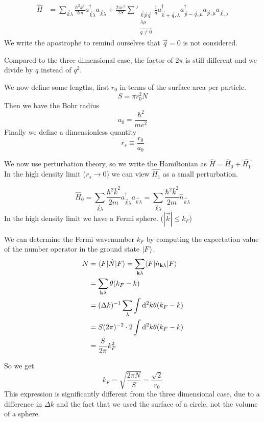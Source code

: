 \begin{align*}
\hat{H} &= \sum_{\vec{k}\lambda}\frac{\hbar^2 k^2}{2m}a^\dagger_{\vec{k}\lambda}a_{\vec{k}\lambda}+ \frac{2\pi e^2}{2 S}\sum'_{\substack{\vec{k} \vec{p} \vec{q} \\ \lambda \mu \\ \vec{q \neq 0}}} \frac{1}{q}a^\dagger_{\vec{k}+ \vec{q}, \lambda}a^\dagger_{\vec{p}- \vec{q}, \mu}a_{\vec{p},\mu}a_{\vec{k}, \lambda}
\end{align*}
We write the apostrophe to remind ourselves that $\vec{q} = 0$ is not considered.

Compared to the three dimensional case, the factor of $2\pi$ is still different and we divide by $q$ instead of $q^2$.

We now define some lengths, first $r_0$ in terms of the surface area per particle.
\[ S = \pi r_0^2 N  \]
Then we have the Bohr radius
\[ a_0 = \frac{\hbar^2}{me^2} \]
Finally we define a dimensionless quantity
\[ r_s \equiv \frac{r_0}{a_0} \]

We now use perturbation theory, so we write the Hamiltonian as $\hat{H} = \hat{H}_0 + \hat{H_1}$. In the high density limit ($r_s \to 0$) we can view $\hat{H_1}$ as a small perturbation.

\[\hat{H}_0 = \sum_{\vec{k}\lambda}\frac{\hbar^2 \bar{k}^2}{2m}a^\dagger_{\vec{k}\lambda}a_{\vec{k}\lambda} = \sum_{\vec{k}\lambda}\frac{\hbar^2 \bar{k}^2}{2m}\hat{n}_{\vec{k}\lambda}\]
In the high density limit we have a Fermi sphere. ($|\vec{k}|\leq k_F$)

We can determine the Fermi wavenumber $k_F$ by computing the expectation value of the number operator in the ground state $\left| F \right\rangle$.
\begin{align*}
N &= \braket[\hat{N}]{F}{F} = \sum_{\vec{k}\lambda} \braket[\hat{n}_{\vec{k}\lambda}]{F}{F} \\
&= \sum_{\vec{k}\lambda} \theta(k_F - k) \\
&= (\Delta k)^{-1} \sum_\lambda \int \diff{^2k} \theta(k_F - k) \\
&= S(2\pi)^{-2}\cdot 2 \int \diff{^2k} \theta(k_F - k) \\
&= \frac{S}{2\pi}k_F^2
\end{align*}

So we get
\[ k_F = \sqrt{\frac{2\pi N}{S}} = \frac{\sqrt{2}}{r_0} \]
This expression is significantly different from the three dimensional case, due to a difference in $\Delta k$ and the fact that we used the surface of a circle, not the volume of a sphere.

